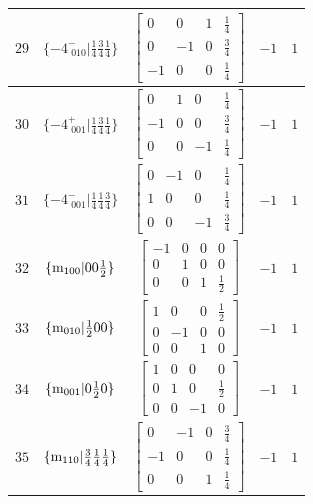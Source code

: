 \documentclass[fleqn,8pt]{jsarticle}
\begin{document}
\begin{longtable}{ccccc}
$ 29 $ & $ \{-4^{-}_{\,\,010}|\frac{1}{4} \frac{3}{4} \frac{1}{4}\} $ & $ \begin{bmatrix} 0 & 0 & 1 & \frac{1}{4} \\ 0 & -1 & 0 & \frac{3}{4} \\ -1 & 0 & 0 & \frac{1}{4} \end{bmatrix} $ & $ -1 $ & $ 1 $ \\ \hline
$ 30 $ & $ \{-4^{+}_{\,\,001}|\frac{1}{4} \frac{3}{4} \frac{1}{4}\} $ & $ \begin{bmatrix} 0 & 1 & 0 & \frac{1}{4} \\ -1 & 0 & 0 & \frac{3}{4} \\ 0 & 0 & -1 & \frac{1}{4} \end{bmatrix} $ & $ -1 $ & $ 1 $ \\ \hline
$ 31 $ & $ \{-4^{-}_{\,\,001}|\frac{1}{4} \frac{1}{4} \frac{3}{4}\} $ & $ \begin{bmatrix} 0 & -1 & 0 & \frac{1}{4} \\ 1 & 0 & 0 & \frac{1}{4} \\ 0 & 0 & -1 & \frac{3}{4} \end{bmatrix} $ & $ -1 $ & $ 1 $ \\ \hline
$ 32 $ & $ \{{\rm m}_{100}|0 0 \frac{1}{2}\} $ & $ \begin{bmatrix} -1 & 0 & 0 & 0 \\ 0 & 1 & 0 & 0 \\ 0 & 0 & 1 & \frac{1}{2} \end{bmatrix} $ & $ -1 $ & $ 1 $ \\ \hline
$ 33 $ & $ \{{\rm m}_{010}|\frac{1}{2} 0 0\} $ & $ \begin{bmatrix} 1 & 0 & 0 & \frac{1}{2} \\ 0 & -1 & 0 & 0 \\ 0 & 0 & 1 & 0 \end{bmatrix} $ & $ -1 $ & $ 1 $ \\ \hline
$ 34 $ & $ \{{\rm m}_{001}|0 \frac{1}{2} 0\} $ & $ \begin{bmatrix} 1 & 0 & 0 & 0 \\ 0 & 1 & 0 & \frac{1}{2} \\ 0 & 0 & -1 & 0 \end{bmatrix} $ & $ -1 $ & $ 1 $ \\ \hline
$ 35 $ & $ \{{\rm m}_{110}|\frac{3}{4} \frac{1}{4} \frac{1}{4}\} $ & $ \begin{bmatrix} 0 & -1 & 0 & \frac{3}{4} \\ -1 & 0 & 0 & \frac{1}{4} \\ 0 & 0 & 1 & \frac{1}{4} \end{bmatrix} $ & $ -1 $ & $ 1 $ \\ \hline

\end{longtable}
\end{document}
